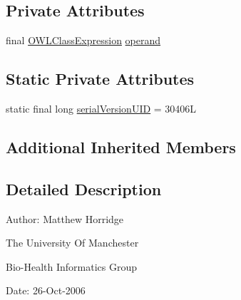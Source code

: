 \subsection*{Private Attributes}
\begin{DoxyCompactItemize}
\item 
final \hyperlink{interfaceorg_1_1semanticweb_1_1owlapi_1_1model_1_1_o_w_l_class_expression}{O\-W\-L\-Class\-Expression} \hyperlink{classuk_1_1ac_1_1manchester_1_1cs_1_1owl_1_1owlapi_1_1_o_w_l_object_complement_of_impl_a43b14e506d2ad556bb7b5ade25c9ff84}{operand}
\end{DoxyCompactItemize}
\subsection*{Static Private Attributes}
\begin{DoxyCompactItemize}
\item 
static final long \hyperlink{classuk_1_1ac_1_1manchester_1_1cs_1_1owl_1_1owlapi_1_1_o_w_l_object_complement_of_impl_a1e1705b06d0a20131912d060cc8ca943}{serial\-Version\-U\-I\-D} = 30406\-L
\end{DoxyCompactItemize}
\subsection*{Additional Inherited Members}


\subsection{Detailed Description}
Author\-: Matthew Horridge\par
 The University Of Manchester\par
 Bio-\/\-Health Informatics Group\par
 Date\-: 26-\/\-Oct-\/2006\par
\par
 

